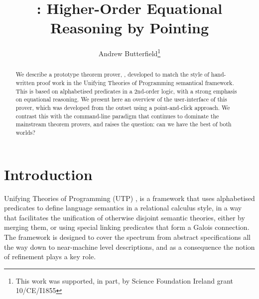 \documentclass[copyright]{eptcs}
\title{\UTP2: Higher-Order Equational Reasoning by Pointing}
\author{
  Andrew Butterfield\thanks{This work was supported, in part, by Science Foundation Ireland grant 10/CE/I1855}
  \institute{
     School of Computer Science and Statitics\\
     Trinity College Dublin\\
     Ireland}
  \email{Andrew.Butterfield@scss.tcd.ie}
}
\begin{document}
\maketitle

\begin{abstract}
We describe a prototype theorem prover, , developed to match the style
of hand-written proof work in the Unifying Theories of Programming semantical
framework. This is based on alphabetised predicates in a 2nd-order logic,
with a strong emphasis on equational reasoning.
We present here an overview of the user-interface of this prover,
which was developed from the outset using a point-and-click approach.
We contrast this with the command-line paradigm that continues to dominate
the mainstream theorem provers,
and raises the question: can we have the best of both worlds?
\end{abstract}

\section{Introduction}\label{sec:intro}

Unifying Theories of Programming (UTP) \cite{UTP-book},
is a framework that uses alphabetised predicates to define language
semantics in a relational calculus style, in a way that facilitates
the unification of otherwise disjoint semantic theories,
either by merging them, or using special linking predicates
that form a Galois connection. The framework is designed
to cover the spectrum from abstract specifications
all the way down to near-machine level descriptions,
and as a consequence the notion of refinement plays a key role.
\end{document}
